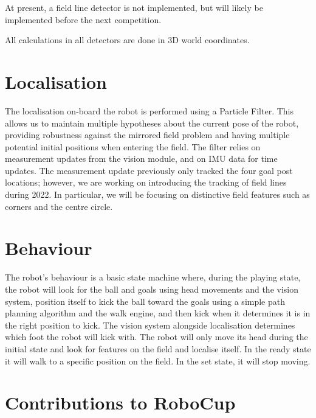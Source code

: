 \documentclass{llncs}
\begin{document}
At present, a field line detector is not implemented, but will likely be implemented before the next competition.

All calculations in all detectors are done in 3D world coordinates.

\section{Localisation}


The localisation on-board the robot is performed using a Particle Filter. This allows us to maintain multiple hypotheses about the current pose of the robot, providing robustness against the mirrored field problem and having multiple potential initial positions when entering the field. The filter relies on measurement updates from the vision module, and on IMU data for time updates. The measurement update previously only tracked the four goal post locations; however, we are working on introducing the tracking of field lines during 2022. In particular, we will be focusing on distinctive field features such as corners and the centre circle.

\medskip

\section{Behaviour}


The robot's behaviour is a basic state machine where, during the playing state, the robot will look for the ball and goals using head movements and the vision system, position itself to kick the ball toward the goals using a simple path planning algorithm and the walk engine, and then kick when it determines it is in the right position to kick. The vision system alongside localisation determines which foot the robot will kick with. The robot will only move its head during the initial state and look for features on the field and localise itself. In the ready state it will walk to a specific position on the field. In the set state, it will stop moving.

\medskip

\section{Contributions to RoboCup}
\end{document}
